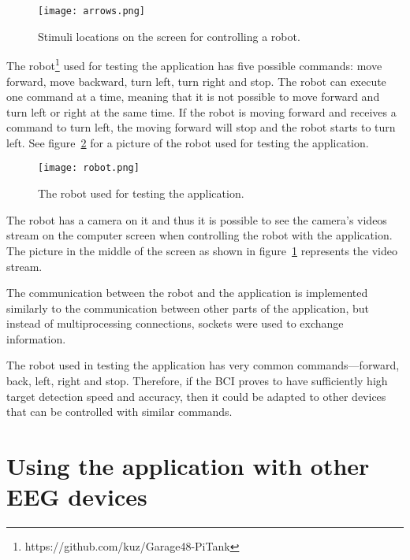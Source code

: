 \begin{figure}[h]
	\centering
	\texttt{[image: arrows.png]}
	\caption{Stimuli locations on the screen for controlling a robot.}
	\label{fig:arrow_stimuli}
\end{figure}

The robot\footnote{https://github.com/kuz/Garage48-PiTank} used for testing the application has five possible commands: move forward, move backward, turn left, turn right and stop. The robot can execute one command at a time, meaning that it is not possible to move forward and turn left or right at the same time. If the robot is moving forward and receives a command to turn left, the moving forward will stop and the robot starts to turn left. See figure~\ref{fig:robot} for a picture of the robot used for testing the application.

\begin{figure}[h]
	\centering
	\texttt{[image: robot.png]}
	\caption{The robot used for testing the application\protect\footnotemark.}
	\label{fig:robot}
\end{figure}
The robot has a camera on it and thus it is possible to see the camera's videos stream on the computer screen when controlling the robot with the application. The picture in the middle of the screen as shown in figure~\ref{fig:arrow_stimuli} represents the video stream.

The communication between the robot and the application is implemented similarly to the communication between other parts of the application, but instead of multiprocessing connections, sockets were used to exchange information.

The robot used in testing the application has very common commands---forward, back, left, right and stop. Therefore, if the \gls{BCI} proves to have sufficiently high \gls{target} detection speed and accuracy, then it could be adapted to other devices that can be controlled with similar commands.

\section{Using the application with other EEG devices}
\label{sec:different_devices}

